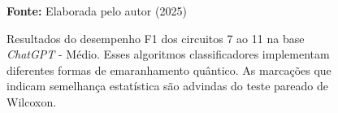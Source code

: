 \begin{figure}
\caption{Resultados do desempenho F1 dos circuitos 7 ao 11 na base \textit{ChatGPT} - Médio. Esses algoritmos classificadores implementam diferentes formas de emaranhamento quântico. As marcações que indicam semelhança estatística são advindas do teste pareado de Wilcoxon.}
\label{fig:f1:medium:g2}
     \centering
    \centering

      \par\medskip\ABNTEXfontereduzida\selectfont\textbf{Fonte:} Elaborada pelo autor (2025) \par\medskip
\end{figure}